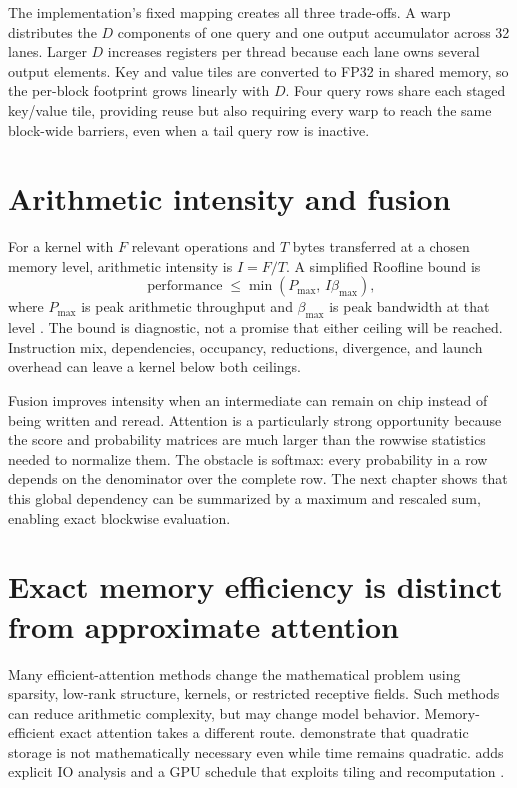 The implementation's fixed mapping creates all three trade-offs. A warp distributes the $D$ components of one query and one output accumulator across 32 lanes. Larger $D$ increases registers per thread because each lane owns several output elements. Key and value tiles are converted to FP32 in shared memory, so the per-block footprint grows linearly with $D$. Four query rows share each staged key/value tile, providing reuse but also requiring every warp to reach the same block-wide barriers, even when a tail query row is inactive.

\section{Arithmetic intensity and fusion}

For a kernel with $F$ relevant operations and $T$ bytes transferred at a chosen memory level, arithmetic intensity is $I=F/T$. A simplified Roofline bound is
\begin{equation}
  \operatorname{performance}\leq\min(P_{\max},\,I\beta_{\max}),
  \label{eq:roofline}
\end{equation}
where $P_{\max}$ is peak arithmetic throughput and $\beta_{\max}$ is peak bandwidth at that level \citep{williams2009roofline}. The bound is diagnostic, not a promise that either ceiling will be reached. Instruction mix, dependencies, occupancy, reductions, divergence, and launch overhead can leave a kernel below both ceilings.

Fusion improves intensity when an intermediate can remain on chip instead of being written and reread. Attention is a particularly strong opportunity because the score and probability matrices are much larger than the rowwise statistics needed to normalize them. The obstacle is softmax: every probability in a row depends on the denominator over the complete row. The next chapter shows that this global dependency can be summarized by a maximum and rescaled sum, enabling exact blockwise evaluation.

\section{Exact memory efficiency is distinct from approximate attention}

Many efficient-attention methods change the mathematical problem using sparsity, low-rank structure, kernels, or restricted receptive fields. Such methods can reduce arithmetic complexity, but may change model behavior. Memory-efficient exact attention takes a different route. \citet{rabe2021selfattention} demonstrate that quadratic storage is not mathematically necessary even while time remains quadratic. \FA{} adds explicit IO analysis and a GPU schedule that exploits tiling and recomputation \citep{dao2022flashattention}.

